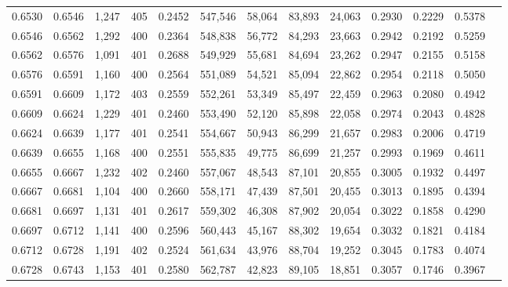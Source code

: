 \begin{tabular}{rrrrrrrrrrrrr}
0.6530 & 0.6546 &  1,247 & 405 &                                     0.2452 & 547,546 &  58,064 &  83,893 &  24,063 & 0.2930 & 0.2229 & 0.5378 \\
0.6546 & 0.6562 &  1,292 & 400 &                                     0.2364 & 548,838 &  56,772 &  84,293 &  23,663 & 0.2942 & 0.2192 & 0.5259 \\
0.6562 & 0.6576 &  1,091 & 401 &                                     0.2688 & 549,929 &  55,681 &  84,694 &  23,262 & 0.2947 & 0.2155 & 0.5158 \\
0.6576 & 0.6591 &  1,160 & 400 &                                     0.2564 & 551,089 &  54,521 &  85,094 &  22,862 & 0.2954 & 0.2118 & 0.5050 \\
0.6591 & 0.6609 &  1,172 & 403 &                                     0.2559 & 552,261 &  53,349 &  85,497 &  22,459 & 0.2963 & 0.2080 & 0.4942 \\
0.6609 & 0.6624 &  1,229 & 401 &                                     0.2460 & 553,490 &  52,120 &  85,898 &  22,058 & 0.2974 & 0.2043 & 0.4828 \\
0.6624 & 0.6639 &  1,177 & 401 &                                     0.2541 & 554,667 &  50,943 &  86,299 &  21,657 & 0.2983 & 0.2006 & 0.4719 \\
0.6639 & 0.6655 &  1,168 & 400 &                                     0.2551 & 555,835 &  49,775 &  86,699 &  21,257 & 0.2993 & 0.1969 & 0.4611 \\
0.6655 & 0.6667 &  1,232 & 402 &                                     0.2460 & 557,067 &  48,543 &  87,101 &  20,855 & 0.3005 & 0.1932 & 0.4497 \\
0.6667 & 0.6681 &  1,104 & 400 &                                     0.2660 & 558,171 &  47,439 &  87,501 &  20,455 & 0.3013 & 0.1895 & 0.4394 \\
0.6681 & 0.6697 &  1,131 & 401 &                                     0.2617 & 559,302 &  46,308 &  87,902 &  20,054 & 0.3022 & 0.1858 & 0.4290 \\
0.6697 & 0.6712 &  1,141 & 400 &                                     0.2596 & 560,443 &  45,167 &  88,302 &  19,654 & 0.3032 & 0.1821 & 0.4184 \\
0.6712 & 0.6728 &  1,191 & 402 &                                     0.2524 & 561,634 &  43,976 &  88,704 &  19,252 & 0.3045 & 0.1783 & 0.4074 \\
0.6728 & 0.6743 &  1,153 & 401 &                                     0.2580 & 562,787 &  42,823 &  89,105 &  18,851 & 0.3057 & 0.1746 & 0.3967 \\

\end{tabular}
